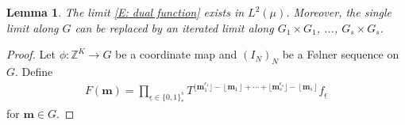 \documentclass[11pt]{amsart}
\newtheorem{lemma}{Lemma}[section]
\theoremstyle{definition}
\DeclareMathOperator*{\E}{\mathbb{E}}
\newcommand{\Q}{{\mathbb Q}}
\newcommand{\Z}{{\mathbb Z}}
\newcommand{\CC}{{\mathcal C}}
\newcommand{\CD}{{\mathcal D}}
\newcommand{\bm}{{\mathbf{m}}}
\newcommand{\eps}{\epsilon}
\newcommand{\ueps}{{\underline{\epsilon}}}
\newcommand{\inv}{^{-1}}
\newcommand{\1}{{\mathbf{1}}}
\DeclareMathOperator{\Span}{Span}
\DeclareMathOperator{\Nil}{Nil}
\newcommand{\brac}[1]{\mathopen{}\left( #1 \mathclose{}\right)}
\newcommand{\floor}[1]{{\left \lfloor #1 \right \rfloor}}
\newcommand{\sfloor}[1]{{\lfloor #1 \rfloor}}
\begin{document}

\begin{lemma}
    The limit \eqref{E: dual function} exists in $L^2(\mu)$. Moreover, the single limit along $G$ can be replaced by an iterated limit along $G_1\times G_1$, ..., $G_s\times G_s$.
\end{lemma}
\begin{proof}
    Let $\phi:\Z^K\to G$ be a coordinate map and $(I_N)_N$ be a F\o lner sequence on $G$. Define
    \begin{align*}
         F(\bm) = \prod_{\ueps\in\{0,1\}^s_*}T^{\sfloor{\bm_1^{\eps_1}}-\floor{\bm_1}+\cdots + \sfloor{\bm_s^{\eps_s}}-\floor{\bm_s}} f_\ueps
     \end{align*}
     for $\bm\in G$.

\end{proof}
\end{document}
